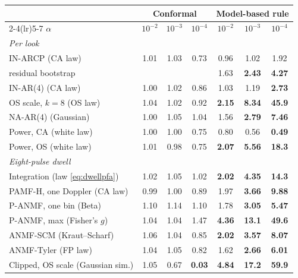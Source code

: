 \begin{tabular}{lcccccc}
\toprule
 & \multicolumn{3}{c}{Conformal} & \multicolumn{3}{c}{Model-based rule}\\
\cmidrule(lr){2-4}\cmidrule(lr){5-7}
$\alpha$ & $10^{-2}$ & $10^{-3}$ & $10^{-4}$ & $10^{-2}$ & $10^{-3}$ & $10^{-4}$\\
\midrule
\emph{Per look} &&&&&&\\
IN-ARCP (CA law) & 1.01 & 1.03 & 0.73 & 0.96 & 1.02 & 1.92\\
\quad residual bootstrap &  &  &  & 1.63 & \textbf{2.43} & \textbf{4.27}\\
IN-AR(4) (CA law) & 1.00 & 1.02 & 0.86 & 1.03 & 1.19 & \textbf{2.73}\\
OS scale, $k=8$ (OS law) & 1.04 & 1.02 & 0.92 & \textbf{2.15} & \textbf{8.34} & \textbf{45.9}\\
NA-AR(4) (Gaussian) & 1.00 & 1.05 & 1.04 & 1.56 & \textbf{2.79} & \textbf{7.46}\\
Power, CA (white law) & 1.00 & 1.00 & 0.75 & 0.80 & 0.56 & \textbf{0.49}\\
Power, OS (white law) & 1.01 & 0.98 & 0.75 & \textbf{2.07} & \textbf{5.56} & \textbf{18.3}\\
\emph{Eight-pulse dwell} &&&&&&\\
Integration (law \eqref{eq:dwellpfa}) & 1.02 & 1.05 & 1.02 & \textbf{2.02} & \textbf{4.35} & \textbf{14.3}\\
PAMF-H, one Doppler (CA law) & 0.99 & 1.00 & 0.89 & 1.97 & \textbf{3.66} & \textbf{9.88}\\
P-ANMF, one bin (Beta) & 1.10 & 1.14 & 1.10 & 1.78 & \textbf{3.05} & \textbf{5.47}\\
P-ANMF, max (Fisher's $g$) & 1.04 & 1.04 & 1.47 & \textbf{4.36} & \textbf{13.1} & \textbf{49.6}\\
ANMF-SCM (Kraut--Scharf) & 1.06 & 1.04 & 0.85 & \textbf{2.02} & \textbf{3.57} & \textbf{8.07}\\
ANMF-Tyler (FP law) & 1.04 & 1.05 & 0.82 & 1.62 & \textbf{2.66} & \textbf{6.01}\\
Clipped, OS scale (Gaussian sim.) & 1.05 & 0.67 & \textbf{0.03} & \textbf{4.84} & \textbf{17.2} & \textbf{59.9}\\
\bottomrule
\end{tabular}
